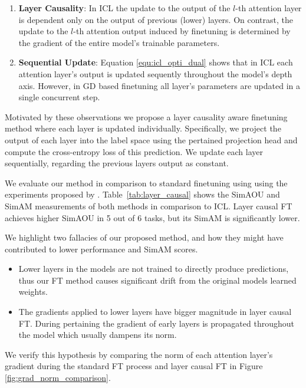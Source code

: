 \begin{enumerate}
	\item \textbf{Layer Causality}: In ICL the update to the output of the $l$-th attention layer is dependent only on the output of previous (lower) layers.
  On contrast, the update to the $l$-th attention output induced by finetuning is determined by the gradient of the entire model's trainable parameters.
	
  \item \textbf{Sequential Update}: Equation \ref{equ:icl_opti_dual} shows that in ICL each attention layer's output is updated sequently throughout the model's depth axis.
  However, in GD based finetuning all layer's parameters are updated in a single concurrent step.
\end{enumerate}




Motivated by these observations we propose a layer causality aware finetuning method where each layer is updated individually.
Specifically, we project the output of each layer into the label space using the pertained projection head and compute the cross-entropy loss of this prediction.
We update each layer sequentially, regarding the previous layers output as constant.  

We evaluate our method in comparison to standard finetuning using using the experiments proposed by \cite{dai2023gpt}.
Table~\ref{tab:layer_causal} shows the SimAOU and SimAM measurements of both methods in comparison to ICL.
Layer causal FT achieves higher SimAOU in 5 out of 6 tasks, but its SimAM is significantly lower.

We highlight two fallacies of our proposed method, and how they might have contributed to lower performance and SimAM scores.
\begin{itemize}
	\item Lower layers in the models are not trained to directly produce predictions, thus our FT method causes significant drift from the original models learned weights.
	\item The gradients applied to lower layers have bigger magnitude in layer causal FT.
				During pertaining the gradient of early layers is propagated throughout the model which usually dampens its norm.  
\end{itemize}

We verify this hypothesis by comparing the norm of  each attention layer's gradient during the standard FT process and layer causal FT in Figure \ref{fig:grad_norm_comparison}.

